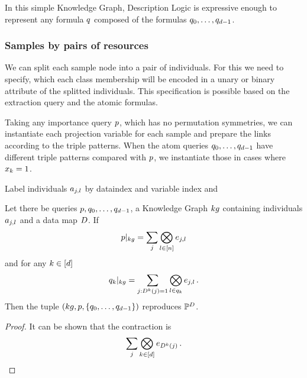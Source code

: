 % 
In this simple Knowledge Graph, Description Logic is expressive enough to represent any formula $q$ composed of the formulas $q_{0},\ldots,q_{d-1}$.






\subsubsection{Samples by pairs of resources}




\begin{remark}
	We can split each sample node into a pair of individuals.
	For this we need to specify, which each class membership will be encoded in a unary or binary attribute of the splitted individuals.
	This specification is possible based on the extraction query and the atomic formulas.
\end{remark}

% 
Taking any importance query $p$, which has no permutation symmetries, we can instantiate each projection variable for each sample and prepare the links according to the triple patterns.
When the atom queries $q_{0},\ldots,q_{d-1}$ have different triple patterns compared with $p$, we instantiate those in cases where $x_{k}=1$.


%
Label individuals $a_{j,l}$ by dataindex and variable index and 

\begin{theorem}
	Let there be queries $p,q_{0},\ldots,q_{d-1}$, a Knowledge Graph $kg$ containing individuals $a_{j,l}$ and a data map $D$.
	If
		\[ {p}|_{kg} = \sum_{j} \bigotimes_{l\in[n]} e_{j,l} \]
	and for any $k\in[d]$
		\[ {q_{k}}|_{kg} 
		= \sum_{j : D^{k}(j)=1} \bigotimes_{l \in q_{k}} e_{j,l} \, . \]
	Then the tuple $(kg,p,\{q_{0},\ldots,q_{d-1}\})$ reproduces $\mathbb{P}^{D}$.
\end{theorem}
\begin{proof}
	It can be shown that the contraction is
		\[ \sum_{j} \bigotimes_{k\in[d]} e_{D^{k}(j)} \, . \]
\end{proof}

